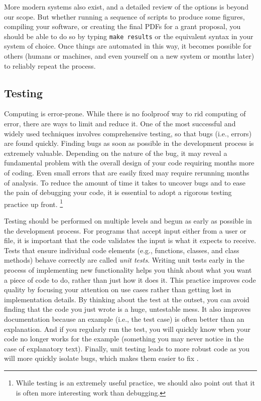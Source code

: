 \documentclass[11pt,oneside,english]{article}
\begin{document}
More modern systems also exist, and a detailed review of the options is beyond
our scope.  But whether running a sequence of scripts to produce some figures,
compiling your software, or creating the final PDFs for a grant proposal, you
should be able to do so by typing \texttt{make results} or the equivalent
syntax in your system of choice.  Once things are automated in this way, it
becomes possible for others (humans or machines, and even yourself on a new
system or months later) to reliably repeat the process.

\subsection{Testing}

Computing is error-prone. While there is no foolproof way to rid computing of
error, there are ways to limit and reduce it. One of the most successful and
widely used techniques involves comprehensive testing, so that bugs (i.e.,
errors) are found quickly.  Finding bugs as soon as possible in the development
process is extremely valuable.  Depending on the nature of the bug, it may
reveal a fundamental problem with the overall design of your code requiring
months more of coding.  Even small errors that are easily fixed may require
rerunning months of analysis.  To reduce the amount of time it takes
to uncover bugs and to ease the pain of debugging your code, it is essential to
adopt a rigorous testing practice up front.%
\footnote{While testing is an extremely useful
practice, we should also point out that it is often more interesting work
than debugging.}

Testing should be performed on multiple levels and begun as early as possible
in the development process.  For programs that accept input either from a user
or file, it is important that the code validates the input is what
it expects to receive. Tests that ensure individual code elements (e.g., functions,
classes, and class methods) behave correctly are called \emph{unit tests}. 
Writing unit tests early in the process of implementing new functionality
helps you think about what you want a piece of code to do, rather than just how
it does it. This practice improves code quality by focusing your attention
on use cases rather than getting lost in implementation details. By thinking
about the test at the outset, you can avoid finding that the code you just
wrote is a huge, untestable mess. It also improves documentation because an
example (i.e., the test case) is often better than an explanation. And if you
regularly run the test, you will quickly know when your code no longer works
for the example (something you may never notice in the case of explanatory
text). Finally, unit testing leads to more robust code as you will more quickly
isolate bugs, which makes them easier to fix \cite{oram2010making}.
\end{document}
